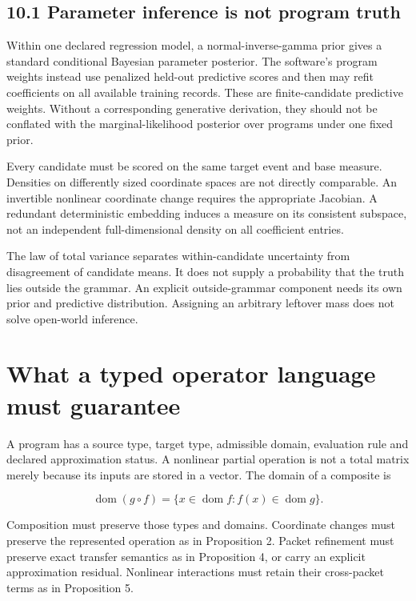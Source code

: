 \subsection{10.1 Parameter inference is not program
truth}\label{LSM:parameter-inference-is-not-program-truth}

Within one declared regression model, a normal-inverse-gamma prior gives
a standard conditional Bayesian parameter posterior. The software's
program weights instead use penalized held-out predictive scores and
then may refit coefficients on all available training records. These are
finite-candidate predictive weights. Without a corresponding generative
derivation, they should not be conflated with the marginal-likelihood
posterior over programs under one fixed prior.

Every candidate must be scored on the same target event and base
measure. Densities on differently sized coordinate spaces are not
directly comparable. An invertible nonlinear coordinate change requires
the appropriate Jacobian. A redundant deterministic embedding induces a
measure on its consistent subspace, not an independent full-dimensional
density on all coefficient entries.

The law of total variance separates within-candidate uncertainty from
disagreement of candidate means. It does not supply a probability that
the truth lies outside the grammar. An explicit outside-grammar
component needs its own prior and predictive distribution. Assigning an
arbitrary leftover mass does not solve open-world inference.

\section{What a typed operator language must guarantee}\label{LSM:what-a-typed-operator-language-must-guarantee}

A program has a source type, target type, admissible domain, evaluation
rule and declared approximation status. A nonlinear partial operation is
not a total matrix merely because its inputs are stored in a vector. The
domain of a composite is

\[
\operatorname{dom}(g\circ f)
=\{x\in\operatorname{dom}f:f(x)\in\operatorname{dom}g\}.
\]

Composition must preserve those types and domains. Coordinate changes
must preserve the represented operation as in Proposition 2. Packet
refinement must preserve exact transfer semantics as in Proposition 4,
or carry an explicit approximation residual. Nonlinear interactions must
retain their cross-packet terms as in Proposition 5.

